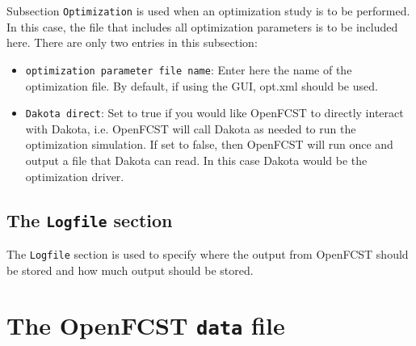 Subsection \texttt{Optimization} is used when an optimization study is to be performed. In this case, the file that includes all optimization parameters is to be included here. There are only two entries in this subsection:
\begin{itemize}
 \item \texttt{optimization parameter file name}: Enter here the name of the optimization file. By default, if using the GUI, opt.xml should be used.
 \item \texttt{Dakota direct}: Set to true if you would like OpenFCST to directly interact with Dakota, i.e. OpenFCST will call Dakota as needed to run the optimization simulation. If set to false, then OpenFCST will run once and output a file that Dakota can read. In this case Dakota would be the optimization driver.
\end{itemize}

\subsection{The \texttt{Logfile} section}
The \texttt{Logfile} section is used to specify where the output from OpenFCST should be stored and how much output should be stored.

\section{The OpenFCST \texttt{data} file}

